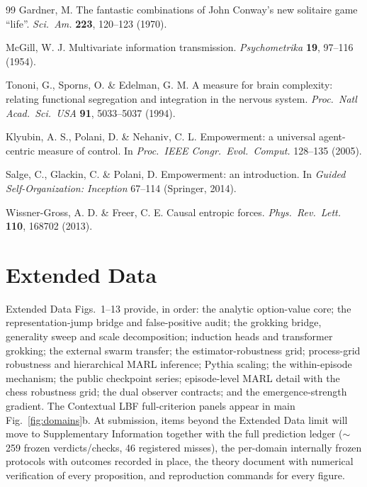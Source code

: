 \documentclass[11pt]{article}
\theoremstyle{definition}
\begin{document}
\begin{thebibliography}{99}
 Gardner, M. The fantastic combinations of John
Conway's new solitaire game ``life''. \emph{Sci.\ Am.} \textbf{223},
120--123 (1970).

 McGill, W. J. Multivariate information
transmission. \emph{Psychometrika} \textbf{19}, 97--116 (1954).

 Tononi, G., Sporns, O. \& Edelman, G. M. A
measure for brain complexity: relating functional segregation and
integration in the nervous system. \emph{Proc.\ Natl Acad.\ Sci.\ USA}
\textbf{91}, 5033--5037 (1994).

 Klyubin, A. S., Polani, D. \& Nehaniv, C. L.
Empowerment: a universal agent-centric measure of control. In
\emph{Proc.\ IEEE Congr.\ Evol.\ Comput.} 128--135 (2005).

 Salge, C., Glackin, C. \& Polani, D. Empowerment:
an introduction. In \emph{Guided Self-Organization: Inception}
67--114 (Springer, 2014).

 Wissner-Gross, A. D. \& Freer, C. E. Causal
entropic forces. \emph{Phys.\ Rev.\ Lett.} \textbf{110}, 168702
(2013).

\end{thebibliography}

\clearpage
\appendix
\renewcommand{\figurename}{Extended Data Fig.}
\setcounter{figure}{0}
\section*{Extended Data}

Extended Data Figs.~1--13 provide, in order: the analytic option-value
core; the representation-jump bridge and false-positive audit; the
grokking bridge, generality sweep and scale decomposition; induction
heads and transformer grokking; the external swarm transfer; the
estimator-robustness grid; process-grid robustness and hierarchical
MARL inference; Pythia scaling; the within-episode mechanism; the
public checkpoint series; episode-level MARL detail with the chess
robustness grid; the dual observer contracts; and the
emergence-strength gradient. The Contextual LBF
full-criterion panels appear in main Fig.~\ref{fig:domains}b. At
submission, items beyond the Extended Data
limit will move to Supplementary Information together with the full
prediction ledger ($\sim$259 frozen verdicts/checks, 46 registered
misses), the per-domain internally frozen protocols with outcomes
recorded in place, the theory document with numerical verification of
every proposition, and reproduction commands for every figure.
\end{document}
